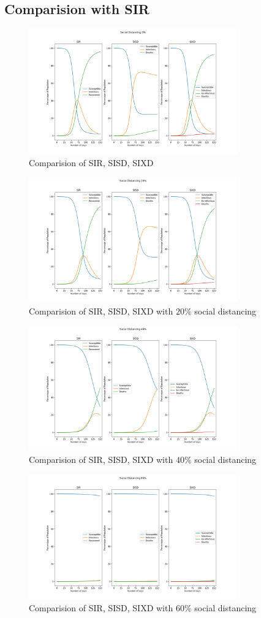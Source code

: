 \documentclass{article}
\begin{document}
	\subsection{Comparision with SIR}
	\begin{figure}[h!]
		\centering
		\includegraphics[width=90mm]{images/SIR/standard.png}
		\caption{Comparision of SIR, SISD, SIXD}
	\end{figure}
	\begin{figure}[h!]
		\centering
		\includegraphics[width=90mm]{images/SIR/social_distance_20.png}
		\caption{Comparision of SIR, SISD, SIXD with $20\%$ social distancing}
	\end{figure}
	\clearpage
	\begin{figure}[h!]
		\centering
		\includegraphics[width=90mm]{images/SIR/social_distance_40.png}
		\caption{Comparision of SIR, SISD, SIXD with $40\%$ social distancing}
	\end{figure}
	\begin{figure}[h!]
		\centering
		\includegraphics[width=90mm]{images/SIR/social_distance_60.png}
		\caption{Comparision of SIR, SISD, SIXD with $60\%$ social distancing}
	\end{figure}
\end{document}
